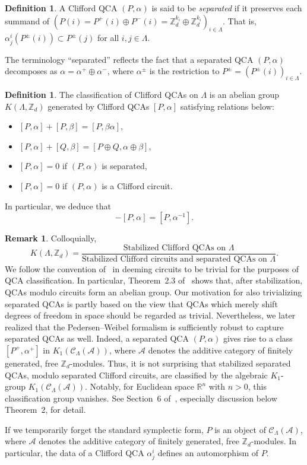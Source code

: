 \documentclass{article}
\theoremstyle{definition}
\newtheorem{defn}[theorem]{Definition}
\newtheorem{rmk}[theorem]{Remark}
\newcommand{\CA}{{ \mathcal A}}
\newcommand{\CalC}{{\mathcal C}}
\newcommand{\ZZ}{{\mathbb Z}}
\def \al {\alpha}
\begin{document}
\begin{defn}
A Clifford QCA $(P,\alpha)$ is said to be \emph{separated} if it preserves each summand of
$(P(i)=P^+(i)\oplus P^-(i)=\mathbb Z_d^{k_i}\oplus \mathbb Z_d^{k_i})_{i\in\Lambda}$.
That is, $\alpha^i_j(P^\pm(i))\subset P^\pm(j)$ for all $i,j\in\Lambda$.

The terminology “separated” reflects the fact that a separated QCA $(P,\alpha)$ decomposes as $\alpha=\alpha^+\oplus\alpha^-$, where $\alpha^\pm$ is the restriction to $P^\pm=(P^\pm(i))_{i\in\Lambda}$.
\end{defn}
\begin{defn}
    The classification of Clifford QCAs on $\Lambda$ is an abelian group $K(\Lambda, \ZZ_d)$ generated by Clifford QCAs $[P, \alpha]$ satisfying relations below:
    \begin{itemize}
        \item $[P, \alpha]+[P, \beta]=[P, \beta \alpha],$
        \item $[P, \alpha]+[Q, \beta]=[P\oplus Q, \alpha \oplus \beta],$
        \item $[P, \alpha]=0$ if $(P, \alpha)$ is separated,
        \item $[P, \alpha]=0$ if $(P, \alpha)$ is a Clifford circuit. 
    \end{itemize}
    In particular, we deduce that $$-[P, \alpha]=[P, \alpha^{-1}].$$
\end{defn}
\begin{rmk}
    Colloquially, $$K(\Lambda, \ZZ_d)=\frac{\text{Stabilized Clifford QCAs on }\Lambda}{\text{Stabilized Clifford circuits and separated QCAs on } \Lambda}.$$ 
    We follow the convention of~\cite{freedman2020classification} in deeming circuits to be trivial for the purposes of QCA classification. In particular, Theorem~2.3 of~\cite{freedman2020classification} shows that, after stabilization, QCAs modulo circuits form an abelian group. Our motivation for also trivializing separated QCAs is partly based on the view that QCAs which merely shift degrees of freedom in space should be regarded as trivial. Nevertheless, we later realized that the Pedersen--Weibel formalism is sufficiently robust to capture separated QCAs as well. Indeed, a separated QCA $(P, \al)$ gives rise to a class $[P^+, \al^+]$ in $K_1(\CalC_\Lambda(\CA))$, where $\mathcal{A}$ denotes the additive category of finitely generated, free $\mathbb{Z}_d$-modules. Thus, it is not surprising that stabilized separated QCAs, modulo separated Clifford circuits, are classified by the algebraic $K_1$-group $K_1(\CalC_\Lambda(\CA))$. Notably, for Euclidean space $\mathbb{R}^n$ with $n>0$, this classification group vanishes. See Section~6 of~\cite{sun2025clifford}, especially discussion below Theorem~2, for detail.
\end{rmk}
If we temporarily forget the standard symplectic form, $P$ is an object of 
$\mathcal{C}_\Lambda(\mathcal{A})$, where $\mathcal{A}$ denotes the additive category of finitely generated, free $\mathbb{Z}_d$-modules. 
In particular, the data of a Clifford QCA $\alpha^i_j$ defines an automorphism of $P$.
\end{document}
